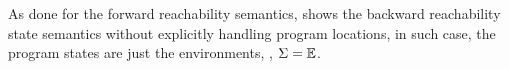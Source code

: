 As done for the forward reachability semantics,  shows the backward reachability state semantics without explicitly handling program locations, in such case, the program states are just the environments, \ie, $\Sigma = \mathbb{E}$.







